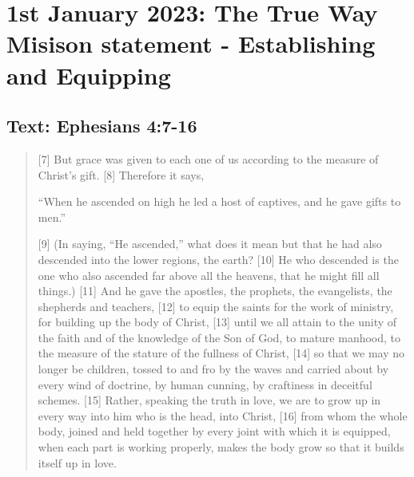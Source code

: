 \section{1st January 2023: The True Way Misison statement - Establishing and Equipping}
\subsection*{Text: Ephesians 4:7-16}
  \begin{quote}
    [7] But grace was given to each one of us according to the measure of Christ’s gift. [8] Therefore it says,

    “When he ascended on high he led a host of captives,
        and he gave gifts to men.”

    [9] (In saying, “He ascended,” what does it mean but that he had also descended into the lower regions, the earth? [10] He who descended is the one who also ascended far above all the heavens, that he might fill all things.) [11] And he gave the apostles, the prophets, the evangelists, the shepherds and teachers, [12] to equip the saints for the work of ministry, for building up the body of Christ, [13] until we all attain to the unity of the faith and of the knowledge of the Son of God, to mature manhood, to the measure of the stature of the fullness of Christ, [14] so that we may no longer be children, tossed to and fro by the waves and carried about by every wind of doctrine, by human cunning, by craftiness in deceitful schemes. [15] Rather, speaking the truth in love, we are to grow up in every way into him who is the head, into Christ, [16] from whom the whole body, joined and held together by every joint with which it is equipped, when each part is working properly, makes the body grow so that it builds itself up in love.
  \end{quote}
